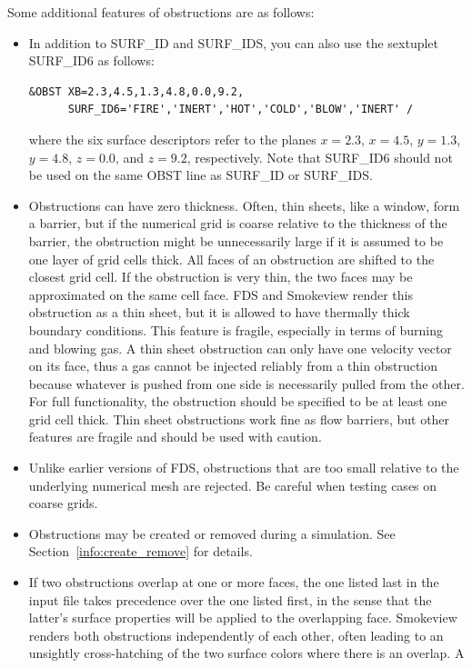 \documentclass[11pt]{book}
\begin{document}
\noindent
Some additional features of obstructions are as follows:
\begin{itemize}
\item In addition to {\ct SURF\_ID} and {\ct SURF\_IDS}, you can also use
the sextuplet {\ct SURF\_ID6} as follows:

\footnotesize
\begin{verbatim}
&OBST XB=2.3,4.5,1.3,4.8,0.0,9.2,
      SURF_ID6='FIRE','INERT','HOT','COLD','BLOW','INERT' /
\end{verbatim}
\normalsize
where the six surface descriptors refer to the planes $x=2.3$, $x=4.5$, $y=1.3$, $y=4.8$,
$z=0.0$, and $z=9.2$, respectively.
Note that {\ct SURF\_ID6} should not be used on the same {\ct OBST}
line as {\ct SURF\_ID} or {\ct SURF\_IDS}.
\item Obstructions can have zero thickness. Often, thin sheets, like a window, form a barrier,
but if the numerical grid is coarse relative to the thickness of the barrier, the obstruction
might be unnecessarily large if it is assumed to be one layer of grid cells thick. All faces
of an obstruction are shifted to the closest grid cell. If the obstruction is very thin, the two
faces may be approximated on the same cell face. FDS and Smokeview render
this obstruction as a thin sheet, but it is allowed to have thermally
thick boundary conditions. This feature is fragile, especially in terms
of burning and blowing gas. A thin sheet obstruction can only have one velocity
vector on its face, thus a gas cannot be injected reliably from a
thin obstruction because whatever is pushed from one side is necessarily pulled from the other.
For full functionality, the obstruction should be specified to
be at least one grid cell thick. Thin sheet obstructions
work fine as flow barriers, but other features are fragile and should be used with
caution.
\item Unlike earlier versions of FDS, obstructions that are
too small relative to the underlying numerical mesh are rejected.
Be careful when testing cases on coarse grids.
\item Obstructions may be created or removed during a simulation. See
Section~\ref{info:create_remove} for details.
\item If two obstructions overlap at one or more faces, the one listed last in the input file takes precedence over the one
listed first, in the sense that the latter's surface properties will be applied to the overlapping face. Smokeview renders both obstructions
independently of each other, often leading to an unsightly cross-hatching of the two surface colors where there is an overlap. A

\end{itemize}
\end{document}
